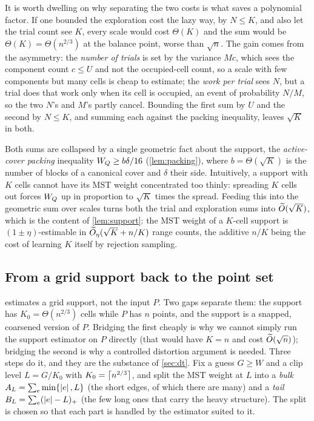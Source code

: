 It is worth dwelling on why separating the two costs is what saves a polynomial factor. If one bounded the
exploration cost the lazy way, by $N\le K$, and also let the trial count see $K$, every scale would cost
$\Theta(K)$ and the sum would be $\Theta(K)=\Theta(n^{2/3})$ at the balance point, worse than $\sqrt n$.
The gain comes from the asymmetry: the \emph{number of trials} is set by the variance $Mc$, which sees the
component count $c\le U$ and not the occupied-cell count, so a scale with few components but many cells is
cheap to estimate; the \emph{work per trial} sees $N$, but a trial does that work only when its cell is
occupied, an event of probability $N/M$, so the two $N$'s and $M$'s partly cancel. Bounding the first sum
by $U$ and the second by $N\le K$, and summing each against the packing inequality, leaves $\sqrt K$ in
both.

Both sums are collapsed by a single geometric fact about the support, the \emph{active-cover packing}
inequality $W_Q\ge b\delta/16$ (\cref{lem:packing}), where $b=\Theta(\sqrt K)$ is the number of blocks of
a canonical cover and $\delta$ their side. Intuitively, a support with $K$ cells cannot have its MST weight
concentrated too thinly: spreading $K$ cells out forces $W_Q$ up in proportion to $\sqrt K$ times the
spread. Feeding this into the geometric sum over scales turns both the trial and exploration sums into
$\widetilde{O}(\sqrt K)$, which is the content of \cref{lem:support}: the MST weight of a $K$-cell support is
$(1\pm\eta)$-estimable in $\widetilde{O}_\eta(\sqrt K+n/K)$ range counts, the additive $n/K$ being the cost of
learning $K$ itself by rejection sampling.

\subsection{From a grid support back to the point set}\label{sec:ov-reduction}

 estimates a grid support, not the input $P$. Two gaps separate them: the support has
$K_0=\Theta(n^{2/3})$ cells while $P$ has $n$ points, and the support is a snapped, coarsened version of
$P$. Bridging the first cheaply is why we cannot simply run the support estimator on $P$ directly (that
would have $K=n$ and cost $\widetilde{O}(\sqrt n)$); bridging the second is why a controlled distortion argument is
needed. Three steps do it, and they are the substance of \cref{sec:dt}. Fix a guess $G\ge W$ and a clip
level $L=G/K_0$ with $K_0=\left\lceil n^{2/3} \right\rceil$, and split the MST weight at $L$ into a \emph{bulk} $A_L=\sum_e
\min\{\left|e\right|,L\}$ (the short edges, of which there are many) and a \emph{tail} $B_L=\sum_e(\left|e\right|-L)_+$
(the few long ones that carry the heavy structure). The split is chosen so that each part is handled by
the estimator suited to it.

